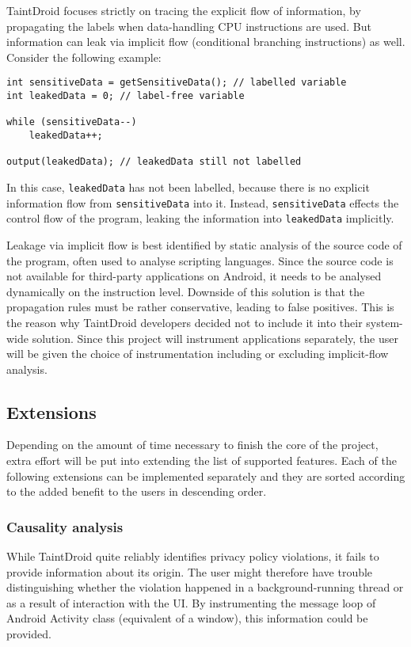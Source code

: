 \documentclass[12pt]{article}
\begin{document}
TaintDroid focuses strictly on tracing the explicit flow of information, 
by propagating the labels when data-handling CPU instructions are used. 
But information can leak via implicit flow (conditional branching 
instructions) as well. Consider the following example:

\begin{verbatim}
int sensitiveData = getSensitiveData(); // labelled variable
int leakedData = 0; // label-free variable

while (sensitiveData--)
    leakedData++;

output(leakedData); // leakedData still not labelled
\end{verbatim}

In this case, \verb|leakedData| has not been labelled, because there is 
no explicit information flow from \verb|sensitiveData| into it. Instead, 
\verb|sensitiveData| effects the control flow of the program, leaking
the information into \verb|leakedData| implicitly. 

Leakage via implicit flow is best identified by static analysis of the 
source code of the program, often used to analyse scripting languages. 
Since the source code is not available for third-party applications on 
Android, it needs to be analysed dynamically on the instruction level.
Downside of this solution is that the propagation rules must be
rather conservative, leading to false positives. This is the reason why
TaintDroid developers decided not to include it into their system-wide
solution. Since this project will instrument applications separately, 
the user will be given the choice of instrumentation including or 
excluding implicit-flow analysis.

\subsection*{Extensions}

Depending on the amount of time necessary to finish the core of the project,
extra effort will be put into extending the list of supported features. Each 
of the following extensions can be implemented separately and they are 
sorted according to the added benefit to the users in descending order.

\subsubsection*{Causality analysis}

While TaintDroid quite reliably identifies privacy policy violations,
it fails to provide information about its origin. The user might therefore 
have trouble distinguishing whether the violation happened in a 
background-running thread or as a result of interaction with the UI. 
By instrumenting the message loop of Android Activity class (equivalent of 
a window), this information could be provided.
\end{document}
